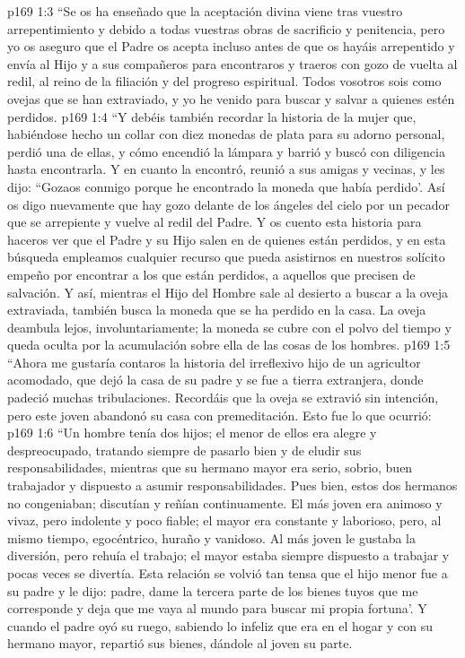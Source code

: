 \vs p169 1:3 “Se os ha enseñado que la aceptación divina viene tras vuestro arrepentimiento y debido a todas vuestras obras de sacrificio y penitencia, pero yo os aseguro que el Padre os acepta incluso antes de que os hayáis arrepentido y envía al Hijo y a sus compañeros para encontraros y traeros con gozo de vuelta al redil, al reino de la filiación y del progreso espiritual. Todos vosotros sois como ovejas que se han extraviado, y yo he venido para buscar y salvar a quienes estén perdidos.
\vs p169 1:4 “Y debéis también recordar la historia de la mujer que, habiéndose hecho un collar con diez monedas de plata para su adorno personal, perdió una de ellas, y cómo encendió la lámpara y barrió y buscó con diligencia hasta encontrarla. Y en cuanto la encontró, reunió a sus amigas y vecinas, y les dijo: “Gozaos conmigo porque he encontrado la moneda que había perdido’. Así os digo nuevamente que hay gozo delante de los ángeles del cielo por un pecador que se arrepiente y vuelve al redil del Padre. Y os cuento esta historia para haceros ver que el Padre y su Hijo salen en  de quienes están perdidos, y en esta búsqueda empleamos cualquier recurso que pueda asistirnos en nuestros solícito empeño por encontrar a los que están perdidos, a aquellos que precisen de salvación. Y así, mientras el Hijo del Hombre sale al desierto a buscar a la oveja extraviada, también busca la moneda que se ha perdido en la casa. La oveja deambula lejos, involuntariamente; la moneda se cubre con el polvo del tiempo y queda oculta por la acumulación sobre ella de las cosas de los hombres.
\vs p169 1:5 “Ahora me gustaría contaros la historia del irreflexivo hijo de un agricultor acomodado, que  dejó la casa de su padre y se fue a tierra extranjera, donde padeció muchas tribulaciones. Recordáis que la oveja se extravió sin intención, pero este joven abandonó su casa con premeditación. Esto fue lo que ocurrió:
\vs p169 1:6 \pc “Un hombre tenía dos hijos; el menor de ellos era alegre y despreocupado, tratando siempre de pasarlo bien y de eludir sus responsabilidades, mientras que su hermano mayor era serio, sobrio, buen trabajador y dispuesto a asumir responsabilidades. Pues bien, estos dos hermanos no congeniaban; discutían y reñían continuamente. El más joven era animoso y vivaz, pero indolente y poco fiable; el mayor era constante y laborioso, pero, al mismo tiempo, egocéntrico, huraño y vanidoso. Al más joven le gustaba la diversión, pero rehuía el trabajo; el mayor estaba siempre dispuesto a trabajar y pocas veces se divertía. Esta relación se volvió tan tensa que el hijo menor fue a su padre y le dijo: padre, dame la tercera parte de los bienes tuyos que me corresponde y deja que me vaya al mundo para buscar mi propia fortuna’. Y cuando el padre oyó su ruego, sabiendo lo infeliz que era en el hogar y con su hermano mayor, repartió sus bienes, dándole al joven su parte.
